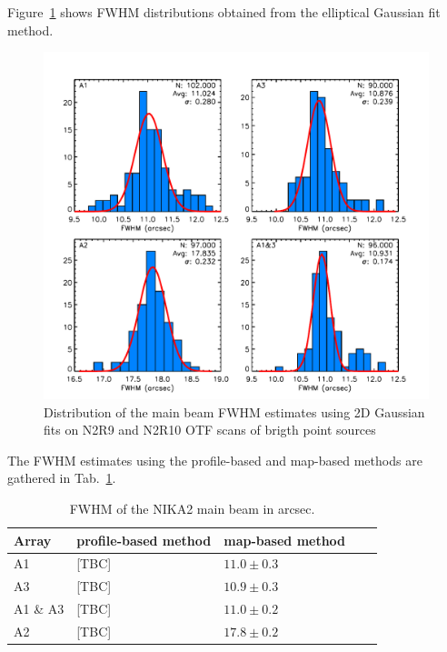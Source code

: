 Figure~\ref{fig:fwhm_map} shows FWHM distributions obtained from the elliptical Gaussian fit method.


\begin{figure}
\begin{center}
  \includegraphics[clip, angle=0, scale=0.7]{Figures/Main_Beam_FWHM_N2R9_10.pdf}
\caption{Distribution of the main beam FWHM estimates using 2D
  Gaussian fits on N2R9 and N2R10 OTF scans of brigth point sources}
\label{fig:fwhm_map}
\end{center}
\end{figure}


The FWHM estimates using the profile-based and map-based methods are gathered in Tab.~\ref{tab:fwhm}. 
\begin{table}
  \caption[]{FWHM of the NIKA2 main beam in arcsec.}
  \centering
  \begin{tabular}{|l|l|l|l|l|}
    \hline
    Array & profile-based method & map-based method \\
    \hline
    A1       & [TBC] & $11.0 \pm 0.3$ \\
    A3       & [TBC] & $10.9 \pm 0.3$ \\
    A1 \& A3 & [TBC] & $11.0 \pm 0.2$ \\
    A2       & [TBC] & $17.8 \pm 0.2$ \\
    \hline
  \end{tabular}
  \label{tab:fwhm}
\end{table}



